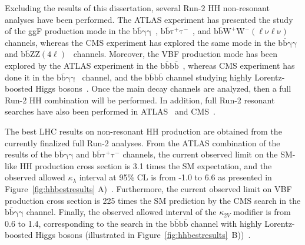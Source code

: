 Excluding the results of this dissertation, several Run-2 HH non-resonant analyses have been performed. The ATLAS experiment has presented the study of the ggF production mode in the $\mathrm{b\overline{b}\gamma\gamma}$~\cite{atlasfullrun2bbgg}, $\mathrm{b\overline{b}\tau^{+}\tau^{-}}$~\cite{atlasrun2bbtt},  and $\mathrm{b\overline{b}W^{+}W^{-}(\ell\nu\ell\nu)}$~\cite{atlasfullrun2bbwwdilep} channels, whereas the CMS experiment has explored the same mode in the $\mathrm{b\overline{b}\gamma\gamma}$~\cite{cmsfullrun2bbgg} and $\mathrm{b\overline{b}ZZ(4\ell)}$~\cite{cmsbbzz4l} channels. Moreover, the VBF production mode has been explored by the ATLAS experiment in the $\mathrm{b\overline{b}b\overline{b}}$~\cite{atlasfullrun2vbf4b}, whereas CMS experiment has done it in the $\mathrm{b\overline{b}\gamma\gamma}$~\cite{cmsfullrun2bbgg} channel, and the $\mathrm{b\overline{b}b\overline{b}}$ channel studying highly Lorentz-boosted Higgs bosons~\cite{cmsrun2boostedbbbb}.  Once the main decay channels are analyzed, then a full Run-2 HH combination will be performed. In addition, full Run-2 resonant searches have also been performed in ATLAS~\cite{atlasfullrun2bbgg,atlasrun2bbtt,atlasfullrun2vbf4b} and CMS~\cite{cmsrun2resboostbbbb,cmsrun2resboostbbww}. 

The best LHC results on non-resonant HH production are obtained from the currently finalized full Run-2 analyses. From the ATLAS combination of the results of the $\mathrm{b\overline{b}\gamma\gamma}$ and $\mathrm{b\overline{b}\tau^{+}\tau^{-}}$ channels, the current observed limit on the SM-like HH production cross section is 3.1 times the SM expectation, and the observed allowed $\kappa_{\lambda}$ interval at 95\% CL is from -1.0 to 6.6 as presented in Figure~\ref{fig:hhbestresults} A)~\cite{ATLAS-CONF-2021-052}. Furthermore, the current observed limit on VBF production cross section is 225 times the SM prediction by the CMS search in the $\mathrm{b\overline{b}\gamma\gamma}$ channel. Finally, the observed allowed interval of the $\kappa_{2V}$ modifier is from 0.6 to 1.4, corresponding to the search in the $\mathrm{b\overline{b}b\overline{b}}$ channel with highly Lorentz-boosted Higgs bosons (illustrated in Figure~\ref{fig:hhbestresults}~B))~\cite{cmsrun2boostedbbbb}.

